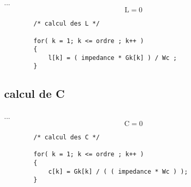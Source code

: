 \documentclass[a4paper,11pt]{article}
\begin{document}
    \paragraph{}
    ... \[ \mbox{L} = 0 \]
    \begin{lstlisting}
        /* calcul des L */

        for( k = 1; k <= ordre ; k++ )
        {
            l[k] = ( impedance * Gk[k] ) / Wc ;
        }

    \end{lstlisting}

\subsection{calcul de C }
    \paragraph{}
    ... \[ \mbox{C} = 0 \]
    \begin{lstlisting}
        /* calcul des C */

        for( k = 1; k <= ordre ; k++ )
        {
            c[k] = Gk[k] / ( ( impedance * Wc ) );
        }

    \end{lstlisting}
\end{document}
